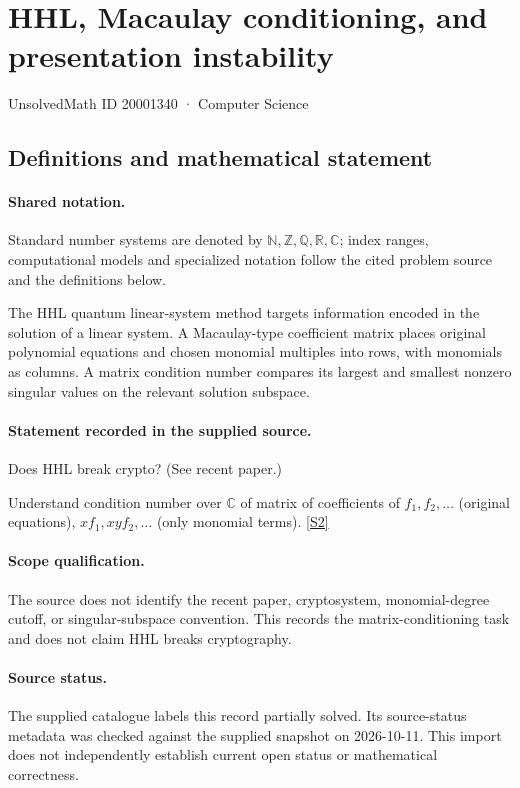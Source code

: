 \documentclass[11pt]{article}
\newcommand{\sref}[2]{\hyperlink{source:#1:#2}{[S#2]}}
\begin{document}
\setcounter{section}{20001339}
\section{HHL, Macaulay conditioning, and presentation instability}\label{20001340}
{\small\sffamily UnsolvedMath ID 20001340 · Computer Science}
\subsection{Definitions and mathematical statement}

\paragraph{Shared notation.}Standard number systems are denoted by $\mathbb N,\mathbb Z,\mathbb Q,\mathbb R,\mathbb C$; index ranges, computational models and specialized notation follow the cited problem source and the definitions below.


The HHL quantum linear-system method targets information encoded in the solution of a linear system. A Macaulay-type coefficient matrix places original polynomial equations and chosen monomial multiples into rows, with monomials as columns. A matrix condition number compares its largest and smallest nonzero singular values on the relevant solution subspace.
\paragraph{Statement recorded in the supplied source.}
Does HHL break crypto? (See recent paper.)

Understand condition number over $\mathbb C$ of matrix of coefficients of $f_1, f_2, \dots$ (original equations), $xf_1, xyf_2, \dots$ (only monomial terms). \sref{20001340}{2}
\paragraph{Scope qualification.}
The source does not identify the recent paper, cryptosystem, monomial-degree cutoff, or singular-subspace convention. This records the matrix-conditioning task and does not claim HHL breaks cryptography.
\paragraph{Source status.}
The supplied catalogue labels this record partially solved. Its source-status metadata was checked against the supplied snapshot on 2026-10-11. This import does not independently establish current open status or mathematical correctness.
\end{document}
